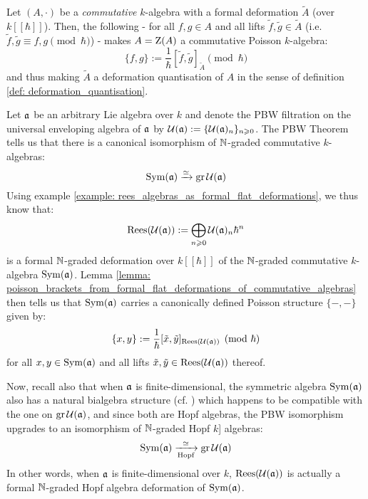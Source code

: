         \begin{corollary} \label{coro: deformation_quantisation_of_poisson_algebras_from_formal_flat_deformations}
            Let $(A, \cdot)$ be a \textit{commutative} $k$-algebra with a formal deformation $\tilde{A}$ (over $k[\![\hbar]\!]$). Then, the following - for all $f, g \in A$ and all lifts $\tilde{f}, \tilde{g} \in \tilde{A}$ (i.e. $\tilde{f}, \tilde{g} \equiv f, g \pmod{\hbar}$) - makes $A = \mathrm{Z}(A)$ a commutative Poisson $k$-algebra:
                $$\{f, g\} := \frac{1}{\hbar}[\tilde{f}, \tilde{g}]_{\tilde{A}} \pmod{\hbar}$$
            and thus making $\tilde{A}$ a deformation quantisation of $A$ in the sense of definition \ref{def: deformation_quantisation}.
        \end{corollary}
        \begin{example} \label{example: PBW_deformations}
            Let $\mathfrak{a}$ be an arbitrary Lie algebra over $k$ and denote the PBW filtration on the universal enveloping algebra of $\mathfrak{a}$ by $\mathcal{U}(\mathfrak{a}) := \{\mathcal{U}(\mathfrak{a})_n\}_{n \geqslant 0}$. The PBW Theorem tells us that there is a canonical isomorphism of $\mathbb{N}$-graded commutative $k$-algebras:
                $$\mathrm{Sym}(\mathfrak{a}) \xrightarrow[]{\simeq} \operatorname{gr} \mathcal{U}(\mathfrak{a})$$
            Using example \ref{example: rees_algebras_as_formal_flat_deformations}, we thus know that:
                $$\operatorname{Rees}(\mathcal{U}(\mathfrak{a})) := \bigoplus_{n \geqslant 0} \mathcal{U}(\mathfrak{a})_n \hbar^n$$
            is a formal $\mathbb{N}$-graded deformation over $k[\![\hbar]\!]$ of the $\mathbb{N}$-graded commutative $k$-algebra $\mathrm{Sym}(\mathfrak{a})$. Lemma \ref{lemma: poisson_brackets_from_formal_flat_deformations_of_commutative_algebras} then tells us that $\mathrm{Sym}(\mathfrak{a})$ carries a canonically defined Poisson structure $\{-, -\}$ given by:
                $$\{x, y\} := \frac{1}{\hbar}[\tilde{x}, \tilde{y}]_{\operatorname{Rees}(\mathcal{U}(\mathfrak{a}))} \pmod{\hbar}$$
            for all $x, y \in \mathrm{Sym}(\mathfrak{a})$ and all lifts $\tilde{x}, \tilde{y} \in \operatorname{Rees}(\mathcal{U}(\mathfrak{a}))$ thereof. 

            Now, recall also that when $\mathfrak{a}$ is finite-dimensional, the symmetric algebra $\mathrm{Sym}(\mathfrak{a})$ also has a natural bialgebra structure (cf. \cite[Chapter III]{kassel_quantum_groups}) which happens to be compatible with the one on $\operatorname{gr} \mathcal{U}(\mathfrak{a})$, and since both are Hopf algebras, the PBW isomorphism upgrades to an isomorphism of $\mathbb{N}$-graded Hopf $k$]
            algebras:
                $$\mathrm{Sym}(\mathfrak{a}) \xrightarrow[\text{Hopf}]{\simeq} \operatorname{gr} \mathcal{U}(\mathfrak{a})$$
            In other words, when $\mathfrak{a}$ is finite-dimensional over $k$, $\operatorname{Rees}(\mathcal{U}(\mathfrak{a}))$ is actually a formal $\mathbb{N}$-graded Hopf algebra deformation of $\mathrm{Sym}(\mathfrak{a})$. 
        \end{example}
    

